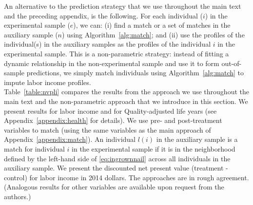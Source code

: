 \noindent An alternative to the prediction strategy that we use throughout the main text and the preceding appendix, is the following. For each individual ($i$) in the experimental sample ($e$), we can: (i) find a match or a set of matches in the auxiliary sample ($n$) using Algorithm~\ref{alg:match}; and (ii) use the profiles of the individual(s) in the auxiliary samples as the profiles of the individual $i$ in the experimental sample. This is a non-parametric strategy: instead of fitting a dynamic relationship in the non-experimental sample and use it to form out-of-sample predictions, we simply match individuals using Algorithm~\ref{alg:match} to impute labor income profiles.\\

\noindent Table~\ref{table:nvpli} compares the results from the approach we use throughout the main text and the non-parametric approach that we introduce in this section. We present results for labor income and for Quality-adjusted life years (see Appendix~\ref{appendix:health} for details). We use pre- and post-treatment variables to match (using the same variables as the main approach of Appendix~\ref{appendix:match}). An individual $l(i)$ in the auxiliary sample is a match for individual $i$ in the experimental sample if it is in the neighborhood defined by the left-hand side of \eqref{eq:ingrownnail} across all individuals in the auxiliary sample. We present the discounted net present value (treatment - control) for labor income in 2014 dollars. The approaches are in rough agreement. (Analogous results for other variables are available upon request from the authors.)\\

